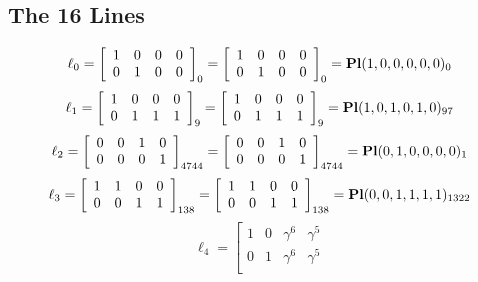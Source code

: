 \documentclass{article}
\begin{document}
{\subsection*{The 16 Lines}
$$
\ell_{0} = 
\left[
\begin{array}{*{4}{r}}
1 & 0 & 0 & 0\\
0 & 1 & 0 & 0\\
\end{array}
\right]
_{0}
=
\left[
\begin{array}{*{4}c}
1  & 0  & 0  & 0\\
0  & 1  & 0  & 0\\
\end{array}
\right]_{0}
={\rm\bf Pl}(1,0,0,0,0,0 )_{0}$$
$$
\ell_{1} = 
\left[
\begin{array}{*{4}{r}}
1 & 0 & 0 & 0\\
0 & 1 & 1 & 1\\
\end{array}
\right]
_{9}
=
\left[
\begin{array}{*{4}c}
1  & 0  & 0  & 0\\
0  & 1  & 1  & 1\\
\end{array}
\right]_{9}
={\rm\bf Pl}(1,0,1,0,1,0 )_{97}$$
$$
\ell_{2} = 
\left[
\begin{array}{*{4}{r}}
0 & 0 & 1 & 0\\
0 & 0 & 0 & 1\\
\end{array}
\right]
_{4744}
=
\left[
\begin{array}{*{4}c}
0  & 0  & 1  & 0\\
0  & 0  & 0  & 1\\
\end{array}
\right]_{4744}
={\rm\bf Pl}(0,1,0,0,0,0 )_{1}$$
$$
\ell_{3} = 
\left[
\begin{array}{*{4}{r}}
1 & 1 & 0 & 0\\
0 & 0 & 1 & 1\\
\end{array}
\right]
_{138}
=
\left[
\begin{array}{*{4}c}
1  & 1  & 0  & 0\\
0  & 0  & 1  & 1\\
\end{array}
\right]_{138}
={\rm\bf Pl}(0,0,1,1,1,1 )_{1322}$$
$$
\ell_{4} = 
\left[
\begin{array}{*{4}{r}}
1 & 0 & \gamma^{6} & \gamma^{5}\\
0 & 1 & \gamma^{6} & \gamma^{5}\\

\end{array}$$}
\end{document}
